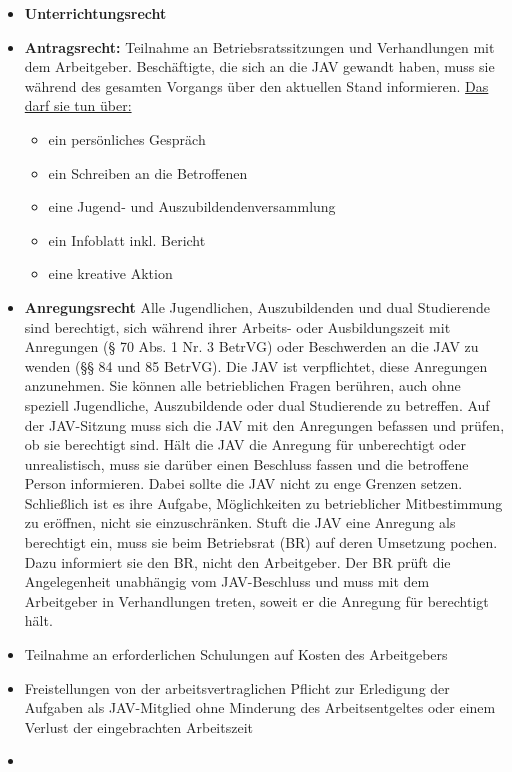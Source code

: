 \begin{itemize}
	\item
	\textbf{Unterrichtungsrecht}
	\item 
	\textbf{Antragsrecht:}
	\newline 
	{
	Teilnahme an Betriebsratssitzungen und Verhandlungen mit dem Arbeitgeber. 
	\newline
		Beschäftigte, die sich an die JAV gewandt haben, muss sie während des gesamten Vorgangs über den aktuellen Stand informieren. \newline 
		\underline{Das darf sie tun über:}
	}
	\begin{itemize}
		\item 
		ein persönliches Gespräch
		\item
		ein Schreiben an die Betroffenen
		\item
		eine Jugend- und Auszubildendenversammlung 
		\item
		ein Infoblatt inkl. Bericht
		\item
		eine kreative Aktion
	\end{itemize}
	\item 
	\textbf{Anregungsrecht}
	\newline 
	{
		Alle Jugendlichen, Auszubildenden und dual Studierende sind berechtigt, sich während ihrer Arbeits- oder Ausbildungszeit mit Anregungen (§ 70 Abs. 1 Nr. 3 BetrVG) oder Beschwerden an die JAV zu wenden (§§ 84 und 85 BetrVG).
		\newline
		Die JAV ist verpflichtet, diese Anregungen anzunehmen. Sie können alle betrieblichen Fragen berühren, auch ohne speziell Jugendliche, Auszubildende oder dual Studierende zu betreffen. Auf der JAV-Sitzung muss sich die JAV mit den Anregungen befassen und prüfen, ob sie berechtigt sind.
		\newline
		Hält die JAV die Anregung für unberechtigt oder unrealistisch, muss sie darüber einen Beschluss fassen und die betroffene Person informieren. Dabei sollte die JAV nicht zu enge Grenzen setzen. Schließlich ist es ihre Aufgabe, Möglichkeiten zu betrieblicher Mitbestimmung zu eröffnen, nicht sie einzuschränken.
		\newline
		Stuft die JAV eine Anregung als berechtigt ein, muss sie beim Betriebsrat (BR) auf deren Umsetzung pochen. Dazu informiert sie den BR, nicht den Arbeitgeber. Der BR prüft die Angelegenheit unabhängig vom JAV-Beschluss und muss mit dem Arbeitgeber in Verhandlungen treten, soweit er die Anregung für berechtigt hält.
	}
	\item
	Teilnahme an erforderlichen Schulungen auf Kosten des Arbeitgebers
	\item
	Freistellungen von der arbeitsvertraglichen Pflicht zur Erledigung der Aufgaben als JAV-Mitglied ohne Minderung des Arbeitsentgeltes oder einem Verlust der eingebrachten Arbeitszeit
	\item 

\end{itemize}

